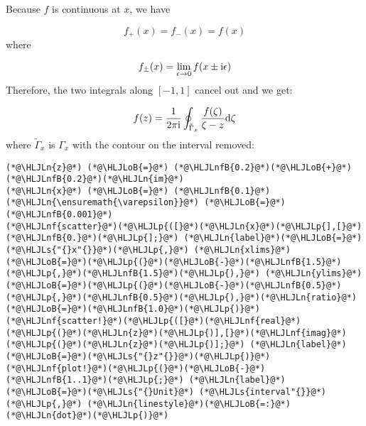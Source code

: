 \documentclass[12pt,a4paper]{article}
\newcommand{\HLJLn}[1]{#1}
\newcommand{\HLJLnf}[1]{\textcolor[RGB]{66,102,213}{#1}}
\newcommand{\HLJLs}[1]{\textcolor[RGB]{201,61,57}{#1}}
\newcommand{\HLJLnfB}[1]{\textcolor[RGB]{59,151,46}{#1}}
\newcommand{\HLJLoB}[1]{\textcolor[RGB]{102,102,102}{\textbf{#1}}}
\newcommand{\HLJLp}[1]{#1}
\def\D{ {\rm d} }
\def\I{ {\rm i} }
\begin{document}
Because $f$ is continuous at $x$, we have

\[
f_+(x) = f_-(x) = f(x)
\]
where

\[
f_\pm(x) = \lim_{\epsilon \rightarrow 0} f(x \pm \I \epsilon)
\]
Therefore, the two integrals along $[-1,1]$ cancel out and we get:

\[
    f(z) = {1 \over 2 \pi \I} \oint_{{\tilde \Gamma}_x} {f(\zeta) \over \zeta - z} \D \zeta
\]
where ${\tilde \Gamma}_x$ is $\Gamma_x$ with the contour on the interval removed:


\begin{lstlisting}
(*@\HLJLn{z}@*) (*@\HLJLoB{=}@*) (*@\HLJLnfB{0.2}@*)(*@\HLJLoB{+}@*)(*@\HLJLnfB{0.2}@*)(*@\HLJLn{im}@*)
(*@\HLJLn{x}@*) (*@\HLJLoB{=}@*) (*@\HLJLnfB{0.1}@*)
(*@\HLJLn{\ensuremath{\varepsilon}}@*) (*@\HLJLoB{=}@*) (*@\HLJLnfB{0.001}@*)
(*@\HLJLnf{scatter}@*)(*@\HLJLp{([}@*)(*@\HLJLn{x}@*)(*@\HLJLp{],[}@*)(*@\HLJLnfB{0.}@*)(*@\HLJLp{];}@*) (*@\HLJLn{label}@*)(*@\HLJLoB{=}@*)(*@\HLJLs{"{}x"{}}@*)(*@\HLJLp{,}@*) (*@\HLJLn{xlims}@*)(*@\HLJLoB{=}@*)(*@\HLJLp{(}@*)(*@\HLJLoB{-}@*)(*@\HLJLnfB{1.5}@*)(*@\HLJLp{,}@*)(*@\HLJLnfB{1.5}@*)(*@\HLJLp{),}@*) (*@\HLJLn{ylims}@*)(*@\HLJLoB{=}@*)(*@\HLJLp{(}@*)(*@\HLJLoB{-}@*)(*@\HLJLnfB{0.5}@*)(*@\HLJLp{,}@*)(*@\HLJLnfB{0.5}@*)(*@\HLJLp{),}@*)(*@\HLJLn{ratio}@*)(*@\HLJLoB{=}@*)(*@\HLJLnfB{1.0}@*)(*@\HLJLp{)}@*)
(*@\HLJLnf{scatter!}@*)(*@\HLJLp{([}@*)(*@\HLJLnf{real}@*)(*@\HLJLp{(}@*)(*@\HLJLn{z}@*)(*@\HLJLp{)],[}@*)(*@\HLJLnf{imag}@*)(*@\HLJLp{(}@*)(*@\HLJLn{z}@*)(*@\HLJLp{)];}@*) (*@\HLJLn{label}@*)(*@\HLJLoB{=}@*)(*@\HLJLs{"{}z"{}}@*)(*@\HLJLp{)}@*)
(*@\HLJLnf{plot!}@*)(*@\HLJLp{(}@*)(*@\HLJLoB{-}@*)(*@\HLJLnfB{1..1}@*)(*@\HLJLp{;}@*) (*@\HLJLn{label}@*)(*@\HLJLoB{=}@*)(*@\HLJLs{"{}Unit}@*) (*@\HLJLs{interval"{}}@*)(*@\HLJLp{,}@*) (*@\HLJLn{linestyle}@*)(*@\HLJLoB{=:}@*)(*@\HLJLn{dot}@*)(*@\HLJLp{)}@*)


\end{lstlisting}
\end{document}
